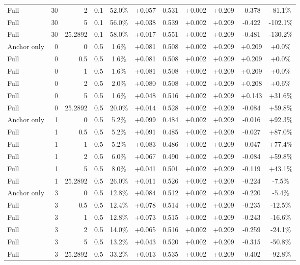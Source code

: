 \begin{table}[htbp]
\begin{tabular}{lrrrccccccc}
Full & 30 & 2 & 0.1 & 52.0\% & +0.057 & 0.531 & +0.002 & +0.209 & -0.378 & -81.1\% \\
Full & 30 & 5 & 0.1 & 56.0\% & +0.038 & 0.539 & +0.002 & +0.209 & -0.422 & -102.1\% \\
Full & 30 & 25.2892 & 0.1 & 58.0\% & +0.017 & 0.551 & +0.002 & +0.209 & -0.481 & -130.2\% \\
Anchor only & 0 & 0 & 0.5 & 1.6\% & +0.081 & 0.508 & +0.002 & +0.209 & +0.209 & +0.0\% \\
Full & 0 & 0.5 & 0.5 & 1.6\% & +0.081 & 0.508 & +0.002 & +0.209 & +0.209 & +0.0\% \\
Full & 0 & 1 & 0.5 & 1.6\% & +0.081 & 0.508 & +0.002 & +0.209 & +0.209 & +0.0\% \\
Full & 0 & 2 & 0.5 & 2.0\% & +0.080 & 0.508 & +0.002 & +0.209 & +0.208 & +0.6\% \\
Full & 0 & 5 & 0.5 & 1.6\% & +0.048 & 0.516 & +0.002 & +0.209 & +0.143 & +31.6\% \\
Full & 0 & 25.2892 & 0.5 & 20.0\% & +0.014 & 0.528 & +0.002 & +0.209 & -0.084 & +59.8\% \\
Anchor only & 1 & 0 & 0.5 & 5.2\% & +0.099 & 0.484 & +0.002 & +0.209 & -0.016 & +92.3\% \\
Full & 1 & 0.5 & 0.5 & 5.2\% & +0.091 & 0.485 & +0.002 & +0.209 & -0.027 & +87.0\% \\
Full & 1 & 1 & 0.5 & 5.2\% & +0.083 & 0.486 & +0.002 & +0.209 & -0.047 & +77.4\% \\
Full & 1 & 2 & 0.5 & 6.0\% & +0.067 & 0.490 & +0.002 & +0.209 & -0.084 & +59.8\% \\
Full & 1 & 5 & 0.5 & 8.0\% & +0.041 & 0.501 & +0.002 & +0.209 & -0.119 & +43.1\% \\
Full & 1 & 25.2892 & 0.5 & 26.0\% & +0.011 & 0.526 & +0.002 & +0.209 & -0.224 & -7.5\% \\
Anchor only & 3 & 0 & 0.5 & 12.8\% & +0.084 & 0.512 & +0.002 & +0.209 & -0.220 & -5.4\% \\
Full & 3 & 0.5 & 0.5 & 12.4\% & +0.078 & 0.514 & +0.002 & +0.209 & -0.235 & -12.5\% \\
Full & 3 & 1 & 0.5 & 12.8\% & +0.073 & 0.515 & +0.002 & +0.209 & -0.243 & -16.6\% \\
Full & 3 & 2 & 0.5 & 14.0\% & +0.065 & 0.516 & +0.002 & +0.209 & -0.259 & -24.1\% \\
Full & 3 & 5 & 0.5 & 13.2\% & +0.043 & 0.520 & +0.002 & +0.209 & -0.315 & -50.8\% \\
Full & 3 & 25.2892 & 0.5 & 33.2\% & +0.013 & 0.535 & +0.002 & +0.209 & -0.402 & -92.8\% \\

\end{tabular}
\end{table}
